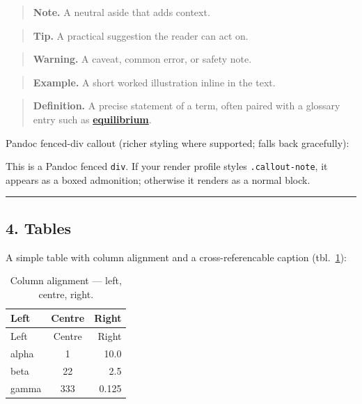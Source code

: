 \documentclass[
]{article}
\theoremstyle{plain}
\theoremstyle{definition}
\begin{document}
\begin{quote}
\textbf{Note.} A neutral aside that adds context.
\end{quote}

\begin{quote}
\textbf{Tip.} A practical suggestion the reader can act on.
\end{quote}

\begin{quote}
\textbf{Warning.} A caveat, common error, or safety note.
\end{quote}

\begin{quote}
\textbf{Example.} A short worked illustration inline in the text.
\end{quote}

\begin{quote}
\textbf{Definition.} A precise statement of a term, often paired with a
glossary entry such as \hyperref[gl:equilibrium]{\textbf{equilibrium}}.
\end{quote}

Pandoc fenced-div callout (richer styling where supported; falls back
gracefully):

This is a Pandoc fenced \texttt{div}. If your render profile styles
\texttt{.callout-note}, it appears as a boxed admonition; otherwise it
renders as a normal block.

\begin{center}\rule{0.5\linewidth}{0.5pt}\end{center}

\subsection{4. Tables}\label{tables}

A simple table with column alignment and a cross-referencable caption
(tbl.~\ref{tbl:gallery_alignment}):

\begin{longtable}[]{@{}lcr@{}}
\caption{Column alignment --- left, centre,
right.}\label{tbl:gallery_alignment}\tabularnewline
\toprule\noalign{}
Left & Centre & Right \\
\midrule\noalign{}
\endfirsthead
\toprule\noalign{}
Left & Centre & Right \\
\midrule\noalign{}
\endhead
\bottomrule\noalign{}
\endlastfoot
alpha & 1 & 10.0 \\
beta & 22 & 2.5 \\
gamma & 333 & 0.125 \\
\end{longtable}
\end{document}
